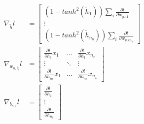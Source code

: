 \documentclass[11pt]{article}
\begin{document}
\newpage
\begin{align*}
\nabla_{\tilde{h}} l&=\begin{bmatrix}
(1-tanh^2(\tilde{h}_1)) \sum_{i} \frac {\partial l}{\partial w_{y,i1}} \\
\vdots \\
(1-tanh^2(\tilde{h}_{n_h})) \sum_{i} \frac {\partial l}{\partial w_{y,i{n_h}}} 
\end{bmatrix} 
\\
\nabla_{w_{h,ij}} l&=\begin{bmatrix}
\frac {\partial l}{\partial h_{1}} x_1 & \hdots & \frac {\partial l}{\partial h_{1}}x_{n_x} \\
\vdots & \ddots & \vdots  \\
\frac {\partial l}{\partial h_{n_h}} x_{1} & \hdots &  \frac {\partial l}{\partial h_{n_h}} x_{n_x}
\end{bmatrix}
\\
\nabla_{b_{h,i}} l&=\begin{bmatrix}
\frac {\partial l}{\partial h_{1}} \\
\vdots \\
\frac {\partial l}{\partial h_{n_h}}
\end{bmatrix}
\end{align*}
\end{document}
